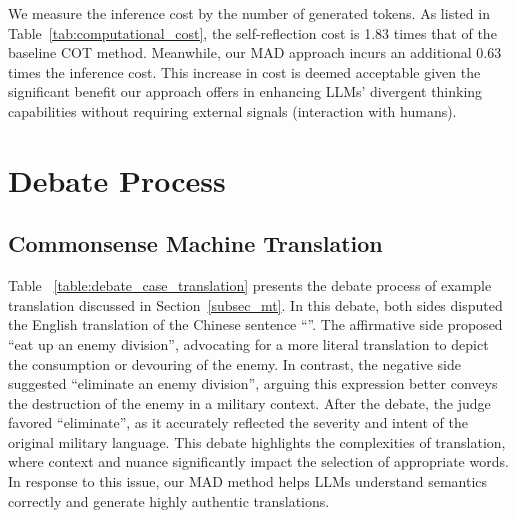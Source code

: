 We measure the inference cost by the number of generated tokens. As listed in Table~\ref{tab:computational_cost}, the self-reflection cost is 1.83 times that of the baseline COT method. Meanwhile, our MAD approach incurs an additional 0.63 times the inference cost. This increase in cost is deemed acceptable given the significant benefit our approach offers in enhancing LLMs' divergent thinking capabilities without requiring external signals (interaction with humans).

\newpage

\section{Debate Process}

\subsection{Commonsense Machine Translation}

Table ~\ref{table:debate_case_translation} presents the debate process of example translation discussed in Section~\ref{subsec_mt}. 
    In this debate, both sides disputed the English translation of the Chinese sentence ``''. The affirmative side proposed ``eat up an enemy division'', advocating for a more literal translation to depict the consumption or devouring of the enemy. In contrast, the negative side suggested ``eliminate an enemy division'', arguing this expression better conveys the destruction of the enemy in a military context. After the debate, the judge favored ``eliminate'', as it accurately reflected the severity and intent of the original military language. This debate highlights the complexities of translation, where context and nuance significantly impact the selection of appropriate words. In response to this issue, our MAD method helps LLMs understand semantics correctly and generate highly authentic translations.

